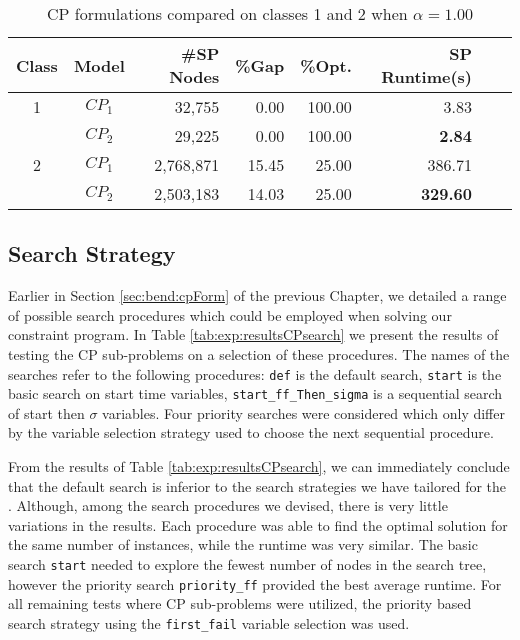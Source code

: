 \begin{table}[tpb]
	\caption{CP formulations compared on classes 1 and 2 when $\alpha=1.00$}
	\centering
	\vspace{2mm}
	\begin{tabular}{ccrrrrrr}
		\toprule
		Class & Model & \#SP Nodes & \%Gap & \%Opt. & SP Runtime(s) \\\midrule\midrule
		1 & $CP_1$ & 32,755 & 0.00 & 100.00 & 3.83  \\
		 & $CP_2$ & 29,225 & 0.00 & 100.00 & \bf{2.84} \\\midrule
		2 & $CP_1$ & 2,768,871 & 15.45 & 25.00 & 386.71 \\
		 & $CP_2$ & 2,503,183 & 14.03 & 25.00 & \bf{329.60} \\
		\bottomrule
	\end{tabular}
	\label{tab:exp:resultsCPmodel}
\end{table}

\subsection{Search Strategy}
\label{sec:exp:cpSearch}
Earlier in Section \ref{sec:bend:cpForm}
of the previous Chapter, we detailed a range of possible search procedures
which could be employed when solving our constraint program.
In Table \ref{tab:exp:resultsCPsearch} we present the results
of testing the CP sub-problems on a selection of these procedures.
The names of the searches refer to the following procedures:
{\tt def} is the default search, {\tt start} is the basic search on start time variables,
{\tt start\_ff\_Then\_sigma} is a sequential search of start then $\sigma$ variables. 
Four priority searches were considered which only differ by the variable selection
strategy used to choose the next sequential procedure.

From the results of Table \ref{tab:exp:resultsCPsearch}, 
we can immediately conclude that the default search
is inferior to the search strategies we have tailored for
the .
Although, among the search procedures we devised, there
is very little variations in the results.
Each procedure was able to find the optimal solution
for the same number of instances,
while the runtime was very similar.
The basic search {\tt start} needed to explore the fewest
number of nodes in the search tree, however the priority search
{\tt priority\_ff} provided the best average runtime.
For all remaining tests where CP sub-problems
were utilized, the priority based search strategy using 
the {\tt first\_fail} variable selection was used.



